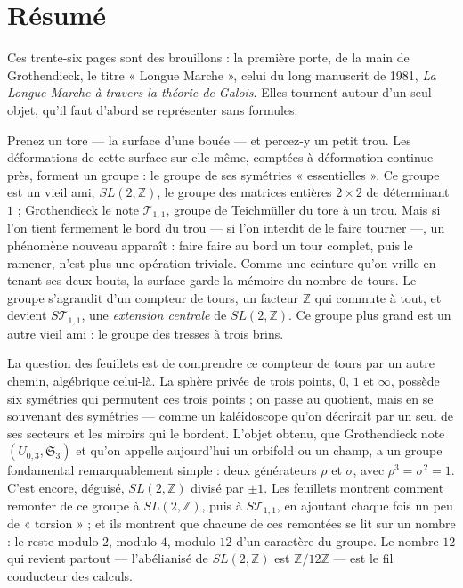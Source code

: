 \documentclass[11pt,a4paper]{article}
\begin{document}
\section*{Résumé}

\begin{resume}
Ces trente-six pages sont des brouillons : la première porte, de la main de
Grothendieck, le titre « Longue Marche », celui du long manuscrit de 1981, \emph{La
Longue Marche à travers la théorie de Galois}. Elles tournent autour d'un seul
objet, qu'il faut d'abord se représenter sans formules.

Prenez un tore — la surface d'une bouée — et percez-y un petit trou. Les
déformations de cette surface sur elle-même, comptées à déformation continue
près, forment un groupe : le groupe de ses symétries « essentielles ». Ce groupe
est un vieil ami, $SL(2, \mathbb{Z})$, le groupe des matrices entières $2 \times
2$ de déterminant $1$ ; Grothendieck le note $\mathcal{T}_{1,1}$, groupe de
Teichmüller du tore à un trou. Mais si l'on tient fermement le bord du trou — si
l'on interdit de le faire tourner —, un phénomène nouveau apparaît : faire faire
au bord un tour complet, puis le ramener, n'est plus une opération triviale. Comme
une ceinture qu'on vrille en tenant ses deux bouts, la surface garde la mémoire
du nombre de tours. Le groupe s'agrandit d'un compteur de tours, un facteur
$\mathbb{Z}$ qui commute à tout, et devient $S\mathcal{T}_{1,1}$, une
\emph{extension centrale} de $SL(2, \mathbb{Z})$. Ce groupe plus grand est un autre
vieil ami : le groupe des tresses à trois brins.

La question des feuillets est de comprendre ce compteur de tours par un autre
chemin, algébrique celui-là. La sphère privée de trois points, $0$, $1$ et $\infty$,
possède six symétries qui permutent ces trois points ; on passe au quotient, mais
en se souvenant des symétries — comme un kaléidoscope qu'on décrirait par un seul
de ses secteurs et les miroirs qui le bordent. L'objet obtenu, que Grothendieck
note $(U_{0,3}, \mathfrak{S}_3)$ et qu'on appelle aujourd'hui un orbifold ou un
champ, a un groupe fondamental remarquablement simple : deux générateurs $\rho$
et $\sigma$, avec $\rho^3 = \sigma^2 = 1$. C'est encore, déguisé,
$SL(2, \mathbb{Z})$ divisé par $\pm 1$. Les feuillets montrent comment remonter
de ce groupe à $SL(2, \mathbb{Z})$, puis à $S\mathcal{T}_{1,1}$, en ajoutant chaque
fois un peu de « torsion » ; et ils montrent que chacune de ces remontées se lit
sur un nombre : le reste modulo $2$, modulo $4$, modulo $12$ d'un caractère du
groupe. Le nombre $12$ qui revient partout — l'abélianisé de $SL(2, \mathbb{Z})$
est $\mathbb{Z}/12\mathbb{Z}$ — est le fil conducteur des calculs.


\end{resume}
\end{document}
